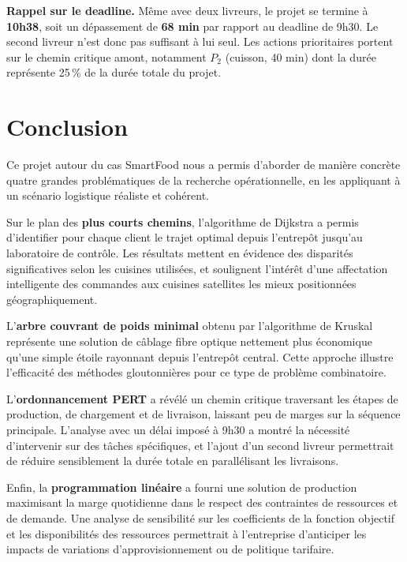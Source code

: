\documentclass[12pt,a4paper]{article}
\begin{document}
\begin{warnbox}
\textbf{Rappel sur le deadline.} Même avec deux livreurs, le projet se termine à
\textbf{10h38}, soit un dépassement de \textbf{68 min} par rapport au deadline de
9h30. Le second livreur n'est donc pas suffisant à lui seul. Les actions prioritaires
portent sur le chemin critique amont, notamment $P_2$ (cuisson, 40 min) dont la durée
représente 25\,\% de la durée totale du projet.
\end{warnbox}

\newpage

\section*{Conclusion}

Ce projet autour du cas SmartFood nous a permis d'aborder de manière concrète quatre
grandes problématiques de la recherche opérationnelle, en les appliquant à un scénario
logistique réaliste et cohérent.

Sur le plan des \textbf{plus courts chemins}, l'algorithme de Dijkstra a permis
d'identifier pour chaque client le trajet optimal depuis l'entrepôt jusqu'au laboratoire
de contrôle. Les résultats mettent en évidence des disparités significatives selon les
cuisines utilisées, et soulignent l'intérêt d'une affectation intelligente des commandes
aux cuisines satellites les mieux positionnées géographiquement.

L'\textbf{arbre couvrant de poids minimal} obtenu par l'algorithme de Kruskal représente
une solution de câblage fibre optique nettement plus économique qu'une simple étoile
rayonnant depuis l'entrepôt central. Cette approche illustre l'efficacité des méthodes
gloutonnières pour ce type de problème combinatoire.

L'\textbf{ordonnancement PERT} a révélé un chemin critique traversant les étapes de
production, de chargement et de livraison, laissant peu de marges sur la séquence
principale. L'analyse avec un délai imposé à 9h30 a montré la nécessité d'intervenir sur
des tâches spécifiques, et l'ajout d'un second livreur permettrait de réduire sensiblement
la durée totale en parallélisant les livraisons.

Enfin, la \textbf{programmation linéaire} a fourni une solution de production maximisant
la marge quotidienne dans le respect des contraintes de ressources et de demande. Une
analyse de sensibilité sur les coefficients de la fonction objectif et les disponibilités
des ressources permettrait à l'entreprise d'anticiper les impacts de variations
d'approvisionnement ou de politique tarifaire.
\end{document}
